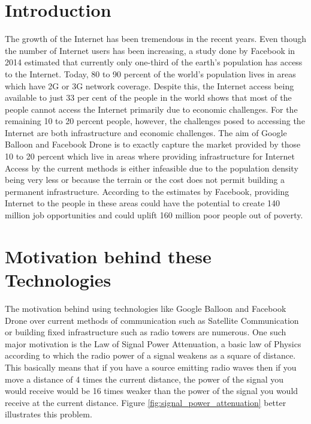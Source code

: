 \documentclass{llncs}
\begin{document}
	\section{Introduction}
	The growth of the Internet has been tremendous in the recent years. Even though the number of 
	Internet users has been increasing, a study done by Facebook in 2014 estimated that currently only one-third of the earth's 
	population has access to the Internet. Today, 80 to 90 percent of the world's population lives in areas
	which have 2G or 3G network coverage. Despite this, the Internet access being available to just 33 per cent of 
	the people in the world shows that most of the people cannot access the Internet primarily due to economic 
	challenges. For the remaining 10 to 20 percent people, however, the challenges posed to accessing the Internet 
	are both infrastructure and economic challenges. The aim of Google Balloon and Facebook Drone is to exactly 
	capture the market provided by those 10 to 20 percent which live in areas where providing infrastructure for 
	Internet Access by the current methods is either infeasible due to the population density being very less or 
	because the terrain or the cost does not permit building a permanent infrastructure.   
	According to the estimates by Facebook, providing Internet to the people in these areas could have the potential to
	create 140 million job opportunities and could uplift 160 million poor people out of poverty\cite{facebookdrone}. 
	
	\section{Motivation behind these Technologies}
	
    \indent The motivation behind using technologies like Google Balloon and Facebook Drone over current methods of 
    communication such as Satellite Communication or building fixed infrastructure such as radio towers are 
    numerous. One such major motivation is the Law of Signal Power Attenuation, a basic law of Physics according 
    to which the radio power of a signal weakens as a square of distance. This basically means that if you have a 
    source emitting radio waves then if you move a distance of 4 times the current distance, the power of the signal 
    you would receive would be 16 times weaker than the power of the signal you would receive at the current distance.
    Figure \ref{fig:signal_power_attenuation} better illustrates this problem. 
    
\end{document}
